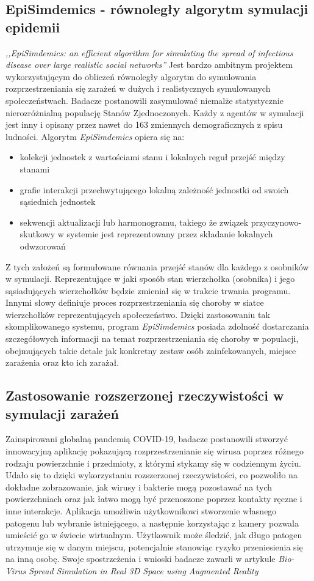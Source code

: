 \subsection{\textbf{EpiSimdemics - równoległy algorytm symulacji epidemii}}
\textit{,,EpiSimdemics: an efficient algorithm for simulating the spread of infectious disease over large realistic social networks''} \cite{bib:konferencja} Jest bardzo ambitnym projektem wykorzystującym do obliczeń równoległy algorytm do symulowania rozprzestrzeniania się zarażeń w dużych i realistycznych symulowanych społeczeństwach. Badacze postanowili zasymulować niemalże statystycznie nierozróżnialną populację Stanów Zjednoczonych. Każdy z agentów w symulacji jest inny i opisany przez nawet do 163 zmiennych demograficznych z spisu ludności. Algorytm \textit{EpiSimdemics} opiera się na:
\begin{itemize}
	\item kolekcji jednostek z wartościami stanu i lokalnych reguł przejść między stanami
	\item grafie interakcji przechwytującego lokalną zależność jednostki od swoich sąsiednich jednostek
	\item sekwencji aktualizacji lub harmonogramu, takiego że związek przyczynowo-skutkowy w systemie jest 	reprezentowany przez składanie lokalnych odwzorowań
\end{itemize}
Z tych założeń są formułowane równania przejść stanów dla każdego z osobników w symulacji. Reprezentujące w jaki sposób stan wierzchołka (osobnika) i jego sąsiadujących wierzchołków będzie zmieniał się w trakcie trwania programu. Innymi słowy definiuje proces rozprzestrzeniania się choroby w siatce wierzchołków reprezentujących społeczeństwo.
	Dzięki zastosowaniu tak skomplikowanego systemu, program \textit{EpiSimdemics} posiada zdolność dostarczania szczegółowych informacji na temat rozprzestrzeniania się choroby w populacji, obejmujących takie detale jak konkretny zestaw osób zainfekowanych, miejsce zarażenia oraz kto ich zarażał.
\subsection{\textbf{Zastosowanie rozszerzonej rzeczywistości w symulacji zarażeń}}

Zainspirowani globalną pandemią COVID-19, badacze postanowili stworzyć innowacyjną aplikację pokazującą rozprzestrzenianie się wirusa poprzez różnego rodzaju powierzchnie i przedmioty, z którymi stykamy się w codziennym życiu. Udało się to dzięki wykorzystaniu rozszerzonej rzeczywistości, co pozwoliło na dokładne zobrazowanie, jak wirusy i bakterie mogą pozostawać na tych powierzchniach oraz jak łatwo mogą być przenoszone poprzez kontakty ręczne i inne interakcje. Aplikacja umożliwia użytkownikowi stworzenie własnego patogenu lub wybranie istniejącego, a następnie korzystając z kamery pozwala umieścić go w świecie wirtualnym. Użytkownik może śledzić, jak długo patogen utrzymuje się w danym miejscu, potencjalnie stanowiąc ryzyko przeniesienia się na inną osobę. Swoje spostrzeżenia i wnioski badacze zawarli w artykule \textit{Bio-Virus Spread Simulation in Real 3D Space using Augmented Reality} \cite{bib:artykul2}


